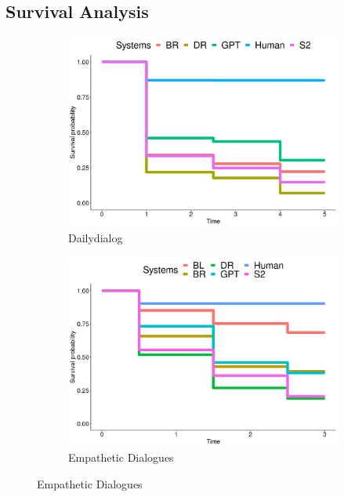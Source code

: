 \documentclass[11pt,a4paper]{article}
\begin{document}
\subsection{Survival Analysis}

\begin{figure}[h!]
  \begin{subfigure}[b]{0.3\textwidth}
    \includegraphics[width=\textwidth]{figures/survival/dailydialog_all.png}
    \caption{Dailydialog}
  \end{subfigure}
  \begin{subfigure}[b]{0.3\textwidth}
    \includegraphics[width=\textwidth]{figures/survival/empathetic_all.png}
    \caption{Empathetic Dialogues}
  \end{subfigure}

\end{figure}
\end{document}
